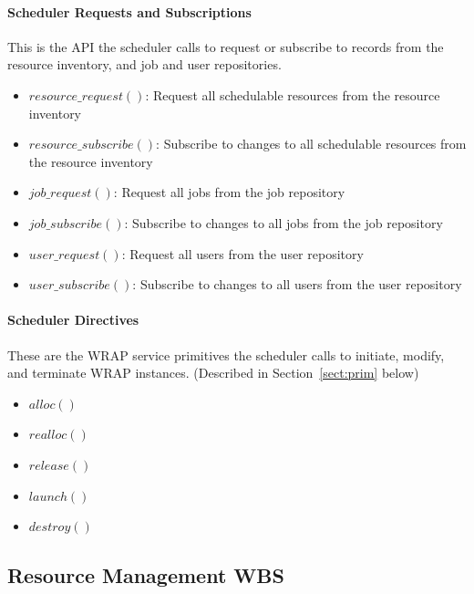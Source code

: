 \paragraph{Scheduler Requests and Subscriptions}
This is the API the scheduler calls to request or subscribe to records
from the resource inventory, and job and user repositories.

\begin{itemize}
\item{$resource\_request()$: Request all schedulable resources from
  the resource inventory}
\item{$resource\_subscribe()$: Subscribe to changes to all schedulable
  resources from the resource inventory}
\item{$job\_request()$: Request all jobs from the job repository}
\item{$job\_subscribe()$: Subscribe to changes to all jobs from the
  job repository}
\item{$user\_request()$: Request all users from the user repository}
\item{$user\_subscribe()$: Subscribe to changes to all users from the
  user repository}
\end{itemize}

\paragraph{Scheduler Directives}
These are the WRAP service primitives the scheduler calls to initiate,
modify, and terminate WRAP instances. (Described in
Section~\ref{sect:prim} below)

\begin{itemize}
\item{$alloc()$}
\item{$realloc()$}
\item{$release()$}
\item{$launch()$}
\item{$destroy()$}
\end{itemize}

\ifwbs
\subsection{Resource Management WBS}

